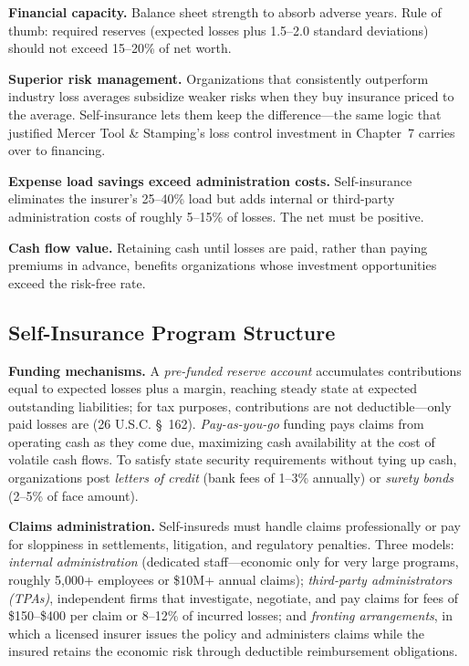\documentclass[11pt,openany]{book}
\begin{document}
\textbf{Financial capacity.} Balance sheet strength to absorb adverse years.
Rule of thumb: required reserves (expected losses plus 1.5--2.0 standard
deviations) should not exceed 15--20\% of net worth.

\textbf{Superior risk management.} Organizations that consistently outperform
industry loss averages subsidize weaker risks when they buy insurance priced
to the average. Self-insurance lets them keep the difference---the same logic
that justified Mercer Tool \& Stamping's loss control investment in
Chapter~7 carries over to financing.

\textbf{Expense load savings exceed administration costs.} Self-insurance
eliminates the insurer's 25--40\% load but adds internal or third-party
administration costs of roughly 5--15\% of losses. The net must be positive.

\textbf{Cash flow value.} Retaining cash until losses are paid, rather than
paying premiums in advance, benefits organizations whose investment
opportunities exceed the risk-free rate.

\subsection{Self-Insurance Program Structure}

\textbf{Funding mechanisms.} A \emph{pre-funded reserve account} accumulates
contributions equal to expected losses plus a margin, reaching steady state
at expected outstanding liabilities; for tax purposes, contributions are not
deductible---only paid losses are (26 U.S.C. \S~162). \emph{Pay-as-you-go}
funding pays claims from operating cash as they come due, maximizing cash
availability at the cost of volatile cash flows. To satisfy state security
requirements without tying up cash, organizations post \emph{letters of
credit} (bank fees of 1--3\% annually) or \emph{surety bonds} (2--5\% of face
amount).

\textbf{Claims administration.} Self-insureds must handle claims
professionally or pay for sloppiness in settlements, litigation, and
regulatory penalties. Three models: \emph{internal administration} (dedicated
staff---economic only for very large programs, roughly 5,000+ employees or
\$10M+ annual claims); \emph{third-party administrators (TPAs)}, independent
firms that investigate, negotiate, and pay claims for fees of \$150--\$400
per claim or 8--12\% of incurred losses; and \emph{fronting arrangements}, in
which a licensed insurer issues the policy and administers claims while the
insured retains the economic risk through deductible reimbursement
obligations.
\end{document}
